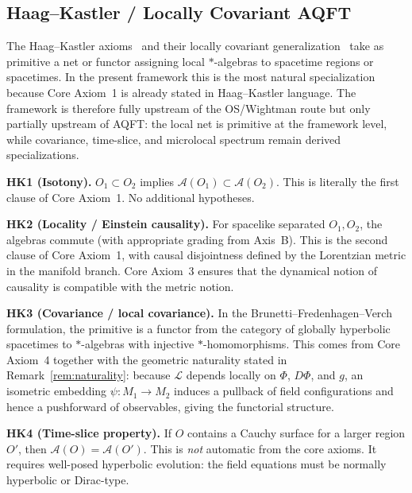 \documentclass[12pt,a4paper]{article}
\theoremstyle{plain}
\theoremstyle{definition}
\theoremstyle{remark}
\newcommand{\alg}{\mathcal{A}}
\newcommand{\lag}{\mathcal{L}}
\begin{document}
\subsection{Haag--Kastler / Locally Covariant AQFT}

The Haag--Kastler axioms~\cite{Haag} and their locally covariant
generalization~\cite{BFV} take as primitive a net or functor assigning
local $*$-algebras to spacetime regions or spacetimes. In the present
framework this is the most natural specialization because Core Axiom~1
is already stated in Haag--Kastler language. The framework is
therefore fully upstream of the OS/Wightman route but only partially
upstream of AQFT: the local net is primitive at the framework level,
while covariance, time-slice, and microlocal spectrum remain derived
specializations.

\medskip

\noindent\textbf{HK1 (Isotony).} $O_1 \subset O_2$ implies
$\alg(O_1) \subset \alg(O_2)$. This is literally the first clause of
Core Axiom~1. No additional hypotheses.

\medskip

\noindent\textbf{HK2 (Locality / Einstein causality).} For spacelike
separated $O_1, O_2$, the algebras commute (with appropriate grading
from Axis~B). This is the second clause of Core Axiom~1, with causal
disjointness defined by the Lorentzian metric in the manifold branch.
Core Axiom~3 ensures that the dynamical notion of causality is
compatible with the metric notion.

\medskip

\noindent\textbf{HK3 (Covariance / local covariance).} In the
Brunetti--Fredenhagen--Verch formulation, the primitive is a functor
from the category of globally hyperbolic spacetimes to $*$-algebras
with injective $*$-homomorphisms. This comes from Core Axiom~4
together with the geometric naturality stated in
Remark~\ref{rem:naturality}:
because $\lag$ depends locally on $\Phi$, $D\Phi$, and $g$, an
isometric embedding $\psi: M_1 \to M_2$ induces a pullback of field
configurations and hence a pushforward of observables, giving the
functorial structure.

\medskip

\noindent\textbf{HK4 (Time-slice property).} If $O$ contains a
Cauchy surface for a larger region $O'$, then
$\alg(O) = \alg(O')$. This is \emph{not} automatic from the core
axioms. It requires well-posed hyperbolic evolution: the field
equations must be normally hyperbolic or Dirac-type.
\end{document}
